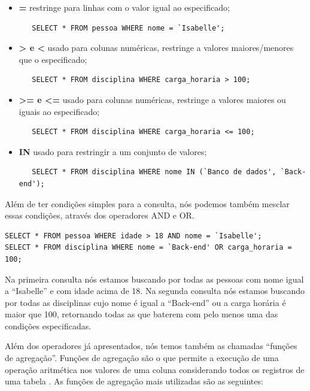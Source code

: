 \documentclass[
	12pt,				%
	openright,			%
	oneside,			%
	a4paper,			%
	english,			%
	french,				%
	spanish,			%
	brazil,				%
	]{abntex2}
\begin{document}
\begin{itemize}
   \item \textbf{=} restringe para linhas com o valor igual ao especificado;
   \begin{verbatim}
   SELECT * FROM pessoa WHERE nome = `Isabelle';
   \end{verbatim}
   
   \item \textbf{\textgreater{} e \textless{}} usado para colunas numéricas, restringe a valores maiores/menores que o especificado;
   \begin{verbatim}
   SELECT * FROM disciplina WHERE carga_horaria > 100;
   \end{verbatim}
   
   \item \textbf{\textgreater{}= e \textless{}=} usado para colunas numéricas, restringe a valores maiores ou iguais ao especificado;
   \begin{verbatim}
   SELECT * FROM disciplina WHERE carga_horaria <= 100;
   \end{verbatim}
   
   \item \textbf{IN} usado para restringir a um conjunto de valores;
   \begin{verbatim}
   SELECT * FROM disciplina WHERE nome IN (`Banco de dados', `Back-end');
   \end{verbatim}
\end{itemize}
 
Além de ter condições simples para a consulta, nós podemos também mesclar essas condições, através dos operadores AND e OR.
\begin{verbatim}
SELECT * FROM pessoa WHERE idade > 18 AND nome = `Isabelle';
SELECT * FROM disciplina WHERE nome = `Back-end' OR carga_horaria = 100;
\end{verbatim}

Na primeira consulta nós estamos buscando por todas as pessoas com nome igual a ``Isabelle'' e com idade acima de 18. Na segunda consulta nós estamos buscando por todas as disciplinas cujo nome é igual a ``Back-end'' ou a carga horária é maior que 100, retornando todas as que baterem com pelo menos uma das condições especificadas.

Além dos operadores já apresentados, nós temos também as chamadas ``funções de agregação''. Funções de agregação são o que permite a execução de uma operação aritmética nos valores de uma coluna considerando todos os registros de uma tabela \cite{agregacao}. As funções de agregação mais utilizadas são as seguintes:
\end{document}
